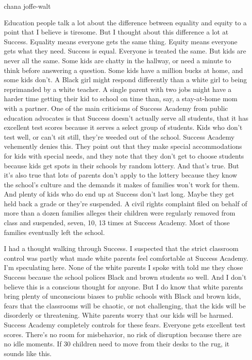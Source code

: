 chana joffe-walt

Education people talk a lot about the difference between equality and
equity to a point that I believe is tiresome. But I thought about this
difference a lot at Success. Equality means everyone gets the same
thing. Equity means everyone gets what they need. Success is equal.
Everyone is treated the same. But kids are never all the same. Some kids
are chatty in the hallway, or need a minute to think before answering a
question. Some kids have a million bucks at home, and some kids don't. A
Black girl might respond differently than a white girl to being
reprimanded by a white teacher. A single parent with two jobs might have
a harder time getting their kid to school on time than, say, a
stay-at-home mom with a partner. One of the main criticisms of Success
Academy from public education advocates is that Success doesn't actually
serve all students, that it has excellent test scores because it serves
a select group of students. Kids who don't test well, or can't sit
still, they're weeded out of the school. Success Academy vehemently
denies this. They point out that they make special accommodations for
kids with special needs, and they note that they don't get to choose
students because kids get spots in their schools by random lottery. And
that's true. But it's also true that lots of parents don't apply to the
lottery because they know the school's culture and the demands it makes
of families won't work for them. And plenty of kids who do end up at
Success don't last long. Maybe they get held back a grade or they're
suspended. A civil rights complaint filed on behalf of more than a dozen
families alleges their children were regularly removed from class and
suspended, seven, 10, 13 times at Success Academy. Most of those
families eventually left the school.

I had a thought walking through Success. I suspected that the strict
classroom control was partly what made white parents feel comfortable at
Success Academy. I'm speculating here. None of the white parents I spoke
with told me they chose Success because the school polices Black and
brown students so well. And I don't believe this is a conscious thought
for anyone. But I do know that white parents bring plenty of unconscious
biases to public schools with Black and brown kids, fears that the
classrooms will be chaotic, or not challenging, that the kids will be
disorderly or threatening. White parents worry that our kids will be
harmed. Success Academy completely controls for these fears. Everyone
gets excellent test scores. There's no room for misbehavior, no risk of
disruption because there are no idle moments. If 30 children need to
move from their desks to the rug, it sounds like this.

